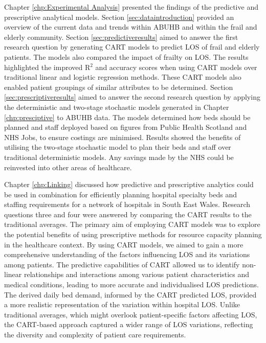 \documentclass[../thesis.tex]{subfiles}
\begin{document}
Chapter \ref{chp:Experimental Analysis} presented the findings of the predictive and prescriptive analytical models. Section \ref{sec:dataintroduction} provided an overview of the current data and trends within ABUHB and within the frail and elderly community. Section \ref{sec:predictiveresults} aimed to answer the first research question by generating CART models to predict LOS of frail and elderly patients. The models also compared the impact of frailty on LOS. The results highlighted the improved R$^{2}$ and accuracy scores when using CART models over traditional linear and logistic regression methods. These CART models also enabled patient groupings of similar attributes to be determined. Section \ref{sec:prescriptiveresults} aimed to answer the second research question by applying the deterministic and two-stage stochastic models generated in Chapter \ref{chp:presciptive} to ABUHB data. The models determined how beds should be planned and staff deployed based on figures from Public Health Scotland and NHS Jobs, to ensure costings are minimised. Results showed the benefits of utilising the two-stage stochastic model to plan their beds and staff over traditional deterministic models. Any savings made by the NHS could be reinvested into other areas of healthcare.

Chapter \ref{chp:Linking} discussed how predictive and prescriptive analytics could be used in combination for efficiently planning hospital specialty beds and staffing requirements for a network of hospitals in South East Wales. Research questions three and four were answered by comparing the CART results to the traditional averages. The primary aim of employing CART models was to explore the potential benefits of using prescriptive methods for resource capacity planning in the healthcare context. By using CART models, we aimed to gain a more comprehensive understanding of the factors influencing LOS and its variations among patients. The predictive capabilities of CART allowed us to identify non-linear relationships and interactions among various patient characteristics and medical conditions, leading to more accurate and individualised LOS predictions. The derived daily bed demand, informed by the CART predicted LOS, provided a more realistic representation of the variation within hospital LOS. Unlike traditional averages, which might overlook patient-specific factors affecting LOS, the CART-based approach captured a wider range of LOS variations, reflecting the diversity and complexity of patient care requirements.
\end{document}
